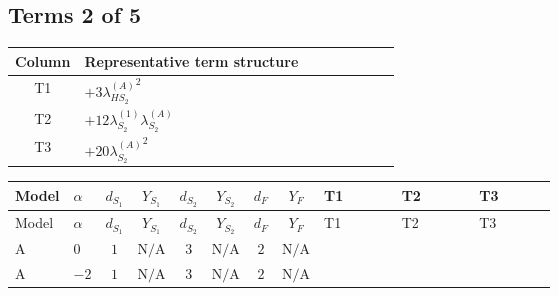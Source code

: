 \documentclass[8pt]{article}
\begin{document}
\begin{landscape}
\subsection*{Terms 2 of 5}
\begin{center}
\begin{tabular}{@{}c >{\raggedright\arraybackslash}p{0.82\linewidth}@{}}
\toprule
Column & Representative term structure \\
\midrule
T1 & \(\displaystyle +3 {\lambda_{HS_2}^{(A)}}^2\) \\
\midrule
T2 & \(\displaystyle +12 {\lambda_{S_2}^{(1)}} {\lambda_{S_2}^{(A)}}\) \\
\midrule
T3 & \(\displaystyle +20 {\lambda_{S_2}^{(A)}}^2\) \\
\midrule
\bottomrule
\end{tabular}
\end{center}
\smallskip
\tiny
\begin{longtable}{@{}llcccccc >{\raggedright\arraybackslash}p{0.21\linewidth} >{\raggedright\arraybackslash}p{0.21\linewidth} >{\raggedright\arraybackslash}p{0.21\linewidth}@{}}
\toprule
Model & $\alpha$ & $d_{S_1}$ & $Y_{S_1}$ & $d_{S_2}$ & $Y_{S_2}$ & $d_F$ & $Y_F$ & T1 & T2 & T3 \\
\midrule
\endfirsthead
\toprule
Model & $\alpha$ & $d_{S_1}$ & $Y_{S_1}$ & $d_{S_2}$ & $Y_{S_2}$ & $d_F$ & $Y_F$ & T1 & T2 & T3 \\
\midrule
\endhead
A & $0$ & $1$ & $\text{N/A}$ & $3$ & $\text{N/A}$ & $2$ & $\text{N/A}$ & \scriptsize\adjustbox{max width=\linewidth}{$\begin{gathered} +3 {\lambda_{HS_2}^{(A)}}^2\end{gathered}$} & \scriptsize\adjustbox{max width=\linewidth}{$\begin{gathered} +12 {\lambda_{S_2}^{(1)}} {\lambda_{S_2}^{(A)}}\end{gathered}$} & \scriptsize\adjustbox{max width=\linewidth}{$\begin{gathered} +20 {\lambda_{S_2}^{(A)}}^2\end{gathered}$} \\
\midrule
A & $-2$ & $1$ & $\text{N/A}$ & $3$ & $\text{N/A}$ & $2$ & $\text{N/A}$ & \scriptsize\adjustbox{max width=\linewidth}{$\begin{gathered} +3 {\lambda_{HS_2}^{(A)}}^2\end{gathered}$} & \scriptsize\adjustbox{max width=\linewidth}{$\begin{gathered} +12 {\lambda_{S_2}^{(1)}} {\lambda_{S_2}^{(A)}}\end{gathered}$} & \scriptsize\adjustbox{max width=\linewidth}{$\begin{gathered} +20 {\lambda_{S_2}^{(A)}}^2\end{gathered}$} \\

\end{longtable}
\end{landscape}
\end{document}
